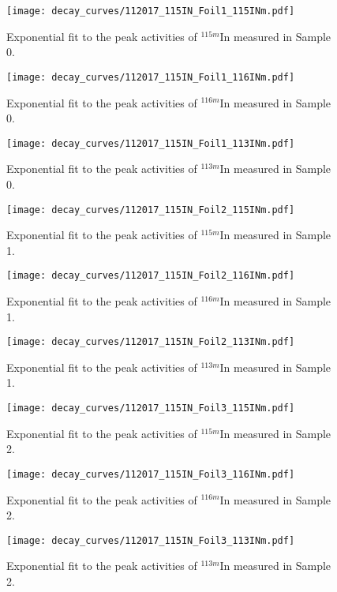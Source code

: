\begin{figure}[htb]
\texttt{[image: decay\_curves/112017\_115IN\_Foil1\_115INm.pdf]}
\caption{Exponential fit to the peak activities of $^{115m}$In measured in Sample 0.
}
\label{fig:112017_115IN_Foil1_115INm}
\end{figure}

\begin{figure}[htb]
\texttt{[image: decay\_curves/112017\_115IN\_Foil1\_116INm.pdf]}
\caption{Exponential fit to the peak activities of $^{116m}$In measured in Sample 0.
}
\label{fig:112017_115IN_Foil1_116INm}
\end{figure}

\begin{figure}[htb]
\texttt{[image: decay\_curves/112017\_115IN\_Foil1\_113INm.pdf]}
\caption{Exponential fit to the peak activities of $^{113m}$In measured in Sample 0.
}
\label{fig:112017_115IN_Foil1_113INm}
\end{figure}

\begin{figure}[htb]
\texttt{[image: decay\_curves/112017\_115IN\_Foil2\_115INm.pdf]}
\caption{Exponential fit to the peak activities of $^{115m}$In measured in Sample 1.
}
\label{fig:112017_115IN_Foil2_115INm}
\end{figure}

\begin{figure}[htb]
\texttt{[image: decay\_curves/112017\_115IN\_Foil2\_116INm.pdf]}
\caption{Exponential fit to the peak activities of $^{116m}$In measured in Sample 1.
}
\label{fig:112017_115IN_Foil2_116INm}
\end{figure}

\begin{figure}[htb]
\texttt{[image: decay\_curves/112017\_115IN\_Foil2\_113INm.pdf]}
\caption{Exponential fit to the peak activities of $^{113m}$In measured in Sample 1.
}
\label{fig:112017_115IN_Foil2_113INm}
\end{figure}

\begin{figure}[htb]
\texttt{[image: decay\_curves/112017\_115IN\_Foil3\_115INm.pdf]}
\caption{Exponential fit to the peak activities of $^{115m}$In measured in Sample 2.
}
\label{fig:112017_115IN_Foil3_115INm}
\end{figure}

\begin{figure}[htb]
\texttt{[image: decay\_curves/112017\_115IN\_Foil3\_116INm.pdf]}
\caption{Exponential fit to the peak activities of $^{116m}$In measured in Sample 2.
}
\label{fig:112017_115IN_Foil3_116INm}
\end{figure}

\begin{figure}[htb]
\texttt{[image: decay\_curves/112017\_115IN\_Foil3\_113INm.pdf]}
\caption{Exponential fit to the peak activities of $^{113m}$In measured in Sample 2.
}
\label{fig:112017_115IN_Foil3_113INm}
\end{figure}

